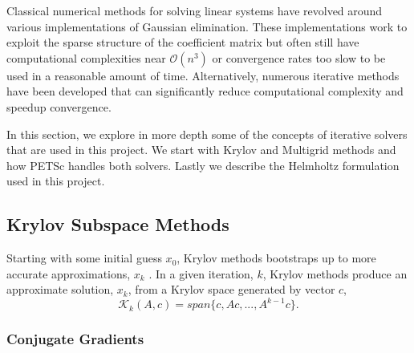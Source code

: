 \documentclass[]{article}
\begin{document}
Classical numerical methods for solving linear systems have revolved around various implementations of Gaussian elimination.  These implementations work to exploit the sparse structure of the coefficient matrix but often still have computational complexities near $\mathcal{O} (n^3)$ or convergence rates too slow to be used in a reasonable amount of time.  Alternatively, numerous iterative methods have been developed that can significantly reduce computational complexity and speedup convergence. 

In this section, we explore in more depth some of the concepts of iterative solvers that are used in this project.  We start with Krylov and Multigrid methods and how PETSc handles both solvers.  Lastly we describe the Helmholtz formulation used in this project.

\subsection{Krylov Subspace Methods}

Starting with some initial guess $x_0$, Krylov methods bootstraps up to more accurate approximations, $x_k$ \cite{Ispen1997}.  In a given iteration, $k$,  Krylov methods produce an approximate solution, $x_k$, from a Krylov space generated by vector $c$,
\begin{equation}
\mathcal{K}_k (A, c) = span \lbrace c, Ac, ..., A^{k-1} c \rbrace.
\end{equation}

\subsubsection{Conjugate Gradients}
\end{document}
